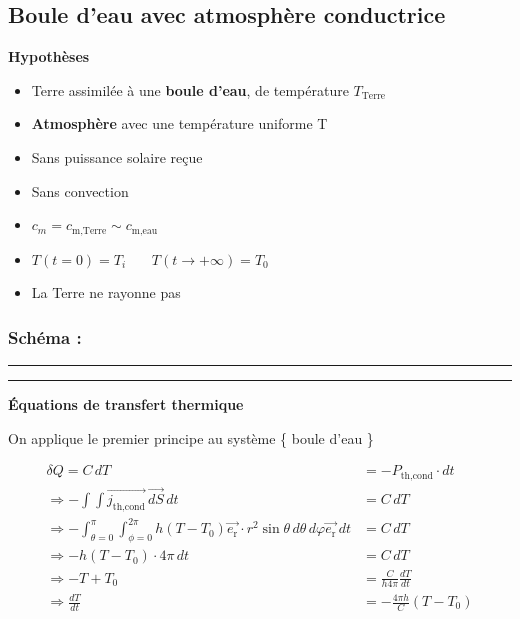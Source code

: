 \documentclass[a4paper,12pt]{article}
\begin{document}
\subsection{Boule d’eau avec atmosphère conductrice }
\textbf{Hypothèses}
\begin{itemize}
    \item Terre assimilée à une \textbf{boule d'eau}, de température \(T_{\text{Terre}}\) 
    \item  \textbf{Atmosphère} avec une température uniforme T 
    \item  Sans puissance solaire reçue  
    \item  Sans convection  
    \item \(c_m=c_{\text{m,Terre}}\sim c_{\text{m,eau}}\) 
    \item $T(t=0) = T_i$ \ \ \
$T(t \to +\infty) = T_0$
    \item La Terre ne rayonne pas
   
\end{itemize}
\vspace{0.5cm}
\subsubsection*{Schéma :} 
\noindent\textcolor{gray}{\rule{\linewidth}{0.4pt}}

\begin{center}
  
\end{center}
\noindent\textcolor{gray}{\rule{\linewidth}{0.4pt}}
\vspace{0.5cm}

\textbf{Équations de transfert thermique}

On applique le premier principe au système \{ boule d'eau  \}

\begin{align*}
\delta Q = C\, dT &= -P_{\text{th,cond}} \cdot dt \\
\Rightarrow -\int \int \vec{j_{\text{th,cond}}}\, \vec{dS}\,dt &= C\, dT \\
\Rightarrow -\int_{\theta=0}^\pi \int_{\phi=0}^{2\pi} h(T - T_0) \vec{e_{\text{r}}}\cdot r^2 \sin\theta\, d\theta\, d\varphi \vec{e_{\text{r}}}\, dt &= C\, dT \\
\Rightarrow -h(T - T_0) \cdot 4\pi\, dt &= C\, dT \\
\Rightarrow -T + T_0 &= \frac{C}{h 4\pi} \frac{dT}{dt} \\
\Rightarrow \frac{dT}{dt} &= -\frac{4\pi h}{C}(T - T_0)
\end{align*}
\end{document}
